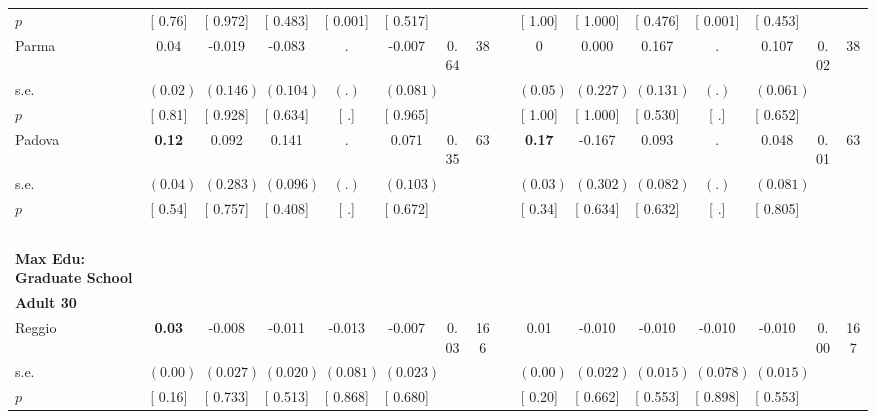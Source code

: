 \begin{longtable}{L{8em} c c c c c c c p{1em} c c c c c c c}
\quad \quad \quad \quad $ p$ & [     0.76] & [    0.972] & [    0.483] & [    0.001] & [    0.517] & & & & [     1.00] & [    1.000] & [    0.476] & [    0.001] & [    0.453] & &  \\[1em]
\quad \quad \quad Parma& 0.04 &    -0.019 &    -0.083 &         . &    -0.007 &      0.64 &        38 & & 0 &     0.000 &     0.167 &         . &     0.107 &      0.02 &        38  \\*
\quad \quad \quad \quad s.e.& $ (     0.02)$ & $ (    0.146)$ & $ (    0.104)$ & $ (        .)$ & $ (    0.081)$ & & & & $ (     0.05)$ & $ (    0.227)$ & $ (    0.131)$ & $ (        .)$ & $ (    0.061)$ & &  \\*
\quad \quad \quad \quad $ p$ & [     0.81] & [    0.928] & [    0.634] & [        .] & [    0.965] & & & & [     1.00] & [    1.000] & [    0.530] & [        .] & [    0.652] & &  \\[1em]
\quad \quad \quad Padova& \textbf{     0.12} &     0.092 &     0.141 &         . &     0.071 &      0.35 &        63 & & \textbf{     0.17} &    -0.167 &     0.093 &         . &     0.048 &      0.01 &        63  \\*
\quad \quad \quad \quad s.e.& $ (     0.04)$ & $ (    0.283)$ & $ (    0.096)$ & $ (        .)$ & $ (    0.103)$ & & & & $ (     0.03)$ & $ (    0.302)$ & $ (    0.082)$ & $ (        .)$ & $ (    0.081)$ & &  \\*
\quad \quad \quad \quad $ p$ & [     0.54] & [    0.757] & [    0.408] & [        .] & [    0.672] & & & & [     0.34] & [    0.634] & [    0.632] & [        .] & [    0.805] & &  \\[1em]
~\\[1em]
\textbf{Max Edu: Graduate School} \\*
\quad \quad \textbf{Adult 30} & & & & & & & & & & & & & & & \\* 
\quad \quad \quad Reggio& \textbf{     0.03} &    -0.008 &    -0.011 &    -0.013 &    -0.007 &      0.03 &       166 & & 0.01 &    -0.010 &    -0.010 &    -0.010 &    -0.010 &      0.00 &       167  \\*
\quad \quad \quad \quad s.e.& $ (     0.00)$ & $ (    0.027)$ & $ (    0.020)$ & $ (    0.081)$ & $ (    0.023)$ & & & & $ (     0.00)$ & $ (    0.022)$ & $ (    0.015)$ & $ (    0.078)$ & $ (    0.015)$ & &  \\*
\quad \quad \quad \quad $ p$ & [     0.16] & [    0.733] & [    0.513] & [    0.868] & [    0.680] & & & & [     0.20] & [    0.662] & [    0.553] & [    0.898] & [    0.553] & &  \\[1em]

\end{longtable}
